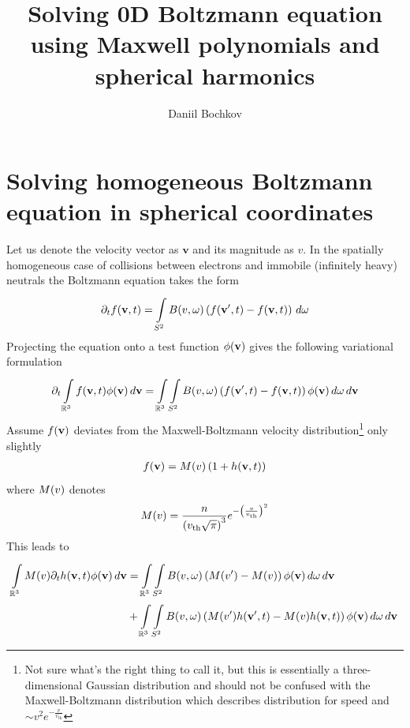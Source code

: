 \documentclass[10pt,letterpaper]{article}
\author{Daniil Bochkov}
\title{Solving 0D Boltzmann equation using Maxwell polynomials and spherical harmonics}
\newcommand{\myint}[2]{\int\limits_{#1}^{#2}}
\newcommand{\diff}[1]{\, d#1}
\newcommand{\vect}[1]{\mathbf{#1}}
\newcommand{\of}[1]{\mleft( #1 \mright)}
\newcommand{\ddt}[1]{\partial_t #1}
\newcommand{\vth}{v_\textrm{th}}
\newcommand{\reals}{\mathbb{R}}
\begin{document}
\section*{Solving homogeneous Boltzmann equation in spherical coordinates}
Let us denote the velocity vector as $\vect{v}$ and its magnitude as $v$. In the spatially homogeneous case of collisions between electrons and immobile (infinitely heavy) neutrals the Boltzmann equation takes the form 
\begin{align*}
\ddt{f}\of{\vect{v},t} = 
\myint{S^2}{}
B\of{v,\omega} \left( f\of{\vect{v}^\prime, t} - f\of{\vect{v},t} \right) \diff{\omega}
\end{align*}
Projecting the equation onto a test function $\phi\of{\vect{v}}$ gives the following variational formulation
\begin{align*}
\ddt{} \myint{\reals^3}{} f\of{\vect{v},t} \phi\of{\vect{v}} \diff{\vect{v}} =
\myint{\reals^3}{} 
\myint{S^2}{}
B\of{v,\omega} \left( f\of{\vect{v}^\prime, t} - f\of{\vect{v},t} \right) \phi\of{\vect{v}} \diff{\omega}
\diff{\vect{v}} 
\end{align*}
Assume $f\of{\vect{v}}$ deviates from the Maxwell-Boltzmann velocity distribution\footnote{Not sure what's the right thing to call it, but this is essentially a three-dimensional Gaussian distribution and should not be confused with the Maxwell-Boltzmann distribution which describes distribution for speed and $\sim v^2 e^{-\frac{v}{\vth}}$} only slightly
\begin{align*}
f\of{\vect{v}} = M\of{v} \left( 1 + h\of{\vect{v},t} \right)
\end{align*}
where $M\of{v}$ denotes
\begin{align*}
M\of{v} = \frac{n}{\left( \vth \sqrt{\pi} \right)^3} e^{-\left(\frac{v}{\vth}\right)^2}
\end{align*}
This leads to
\begin{align*}
\myint{\reals^3}{} M\of{v} \ddt{} h\of{\vect{v},t} \phi\of{\vect{v}} \diff{\vect{v}} &=
\myint{\reals^3}{} 
\myint{S^2}{}
B\of{v,\omega} \left( M\of{v^\prime} - M\of{v} \right) \phi\of{\vect{v}} \diff{\omega}
\diff{\vect{v}} 
\\
&+
\myint{\reals^3}{} 
\myint{S^2}{}
B\of{v,\omega} \left( M\of{v^\prime} h\of{\vect{v}^\prime, t} - M\of{v} h\of{\vect{v},t} \right) \phi\of{\vect{v}} \diff{\omega}
\diff{\vect{v}} 
\end{align*}
\end{document}
